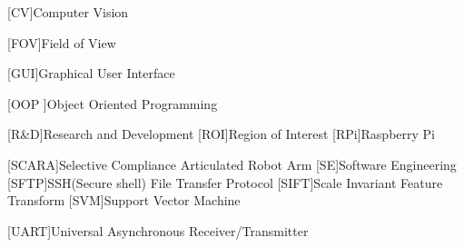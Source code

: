 \begin{acronym}
	[CV]{Computer Vision}
	
	[FOV]{Field of View}
	
	[GUI]{Graphical User Interface}
	
	[OOP ]{Object Oriented Programming }
	
	[R\&D]{Research and Development}
	[ROI]{Region of Interest}
	[RPi]{Raspberry Pi}
			
	[SCARA]{Selective Compliance Articulated Robot Arm}
	[SE]{Software Engineering}
	[SFTP]{SSH(Secure shell) File Transfer Protocol}
	[SIFT]{Scale Invariant Feature Transform}
	[SVM]{Support Vector Machine}
	
	[UART]{Universal Asynchronous Receiver/Transmitter}
\end{acronym}

